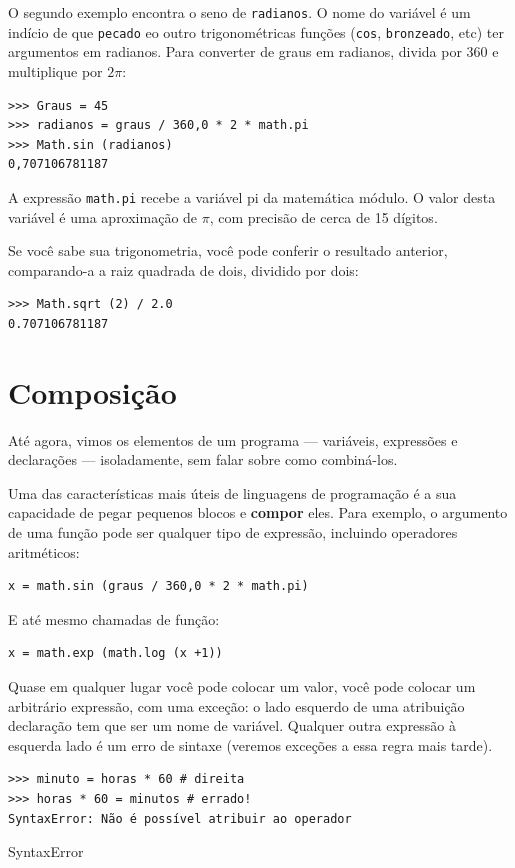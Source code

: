 \documentclass[10pt]{book}
\begin{document}
\begin{exercise}
O segundo exemplo encontra o seno de {\tt radianos}. O nome do
variável é um indício de que {\tt pecado} eo outro trigonométricas
funções ({\tt cos}, {\tt bronzeado}, etc) ter argumentos em radianos. Para
converter de graus em radianos, divida por 360 e multiplique por
$ 2 \pi $:

\begin{verbatim}
>>> Graus = 45
>>> radianos = graus / 360,0 * 2 * math.pi
>>> Math.sin (radianos)
0,707106781187
\end{verbatim}
%
A expressão {\tt math.pi} recebe a variável {pi \tt} da matemática
módulo. O valor desta variável é uma aproximação
de $ \pi $, com precisão de cerca de 15 dígitos.

Se você sabe
sua trigonometria, você pode conferir o resultado anterior, comparando-a
a raiz quadrada de dois, dividido por dois:

\begin{verbatim}
>>> Math.sqrt (2) / 2.0
0.707106781187
\end{verbatim}
%

\section{Composição}

Até agora, vimos os elementos de um programa --- variáveis,
expressões e declarações --- isoladamente, sem falar sobre como
combiná-los.

Uma das características mais úteis de linguagens de programação é a sua
capacidade de pegar pequenos blocos e {\bf compor} eles. Para
exemplo, o argumento de uma função pode ser qualquer tipo de expressão,
incluindo operadores aritméticos:

\begin{verbatim}
x = math.sin (graus / 360,0 * 2 * math.pi)
\end{verbatim}
%
E até mesmo chamadas de função:

\begin{verbatim}
x = math.exp (math.log (x +1))
\end{verbatim}
%
Quase em qualquer lugar você pode colocar um valor, você pode colocar um arbitrário
expressão, com uma exceção: o lado esquerdo de uma atribuição
declaração tem que ser um nome de variável. Qualquer outra expressão à esquerda
lado é um erro de sintaxe (veremos exceções a essa regra
mais tarde).

\begin{verbatim}
>>> minuto = horas * 60 # direita
>>> horas * 60 = minutos # errado!
SyntaxError: Não é possível atribuir ao operador
\end{verbatim}
%
\index{} SyntaxError



\end{exercise}
\end{document}
